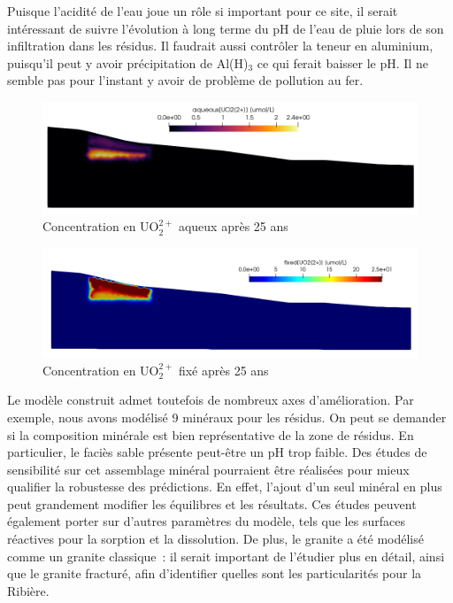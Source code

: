 \documentclass{article}
\newcommand{\blue}[1]{\textcolor{blue}{#1}} %
\begin{document}

Puisque l’acidité de l’eau joue un rôle si important pour ce site, il serait intéressant de suivre l'évolution à long terme du pH de l'eau de pluie lors de son infiltration dans les résidus. Il faudrait aussi contrôler la teneur en aluminium, puisqu’il peut y avoir précipitation de Al(H)$_3$ ce qui ferait baisser le pH. Il ne semble pas pour l’instant y avoir de problème de pollution au fer. 

\begin{figure}[H]
    \centering
    \includegraphics[width=\linewidth]{LJ-UO22P-final.PNG}
    \caption{Concentration en UO$_2^{2+}$ aqueux après 25 ans}
    \label{fig:uo2P-aqueux-final}
\end{figure}

\begin{figure}[H]
    \centering
    \includegraphics[width=\linewidth]{III_B_4_2.png}
    \caption{Concentration en UO$_2^{2+}$ fixé après 25 ans}
    \label{fig:uo2P-fixe-final}
\end{figure}

Le modèle construit admet toutefois de nombreux axes d'amélioration. Par exemple, nous avons modélisé 9 minéraux pour les résidus.
On peut se demander si la composition minérale est bien représentative de la zone de résidus. En particulier, le faciès sable présente peut-être un pH trop faible. Des études de sensibilité sur cet assemblage minéral pourraient être réalisées pour mieux qualifier la robustesse des prédictions.
En effet, l’ajout d’un seul minéral en plus peut grandement modifier les équilibres et les résultats. 
Ces études peuvent également porter sur d’autres paramètres du modèle, tels que les surfaces réactives pour la sorption et la dissolution.
De plus, le granite a été modélisé comme un granite \og classique\fg~: il serait important de l'étudier plus en détail, ainsi que le granite fracturé, afin d'identifier quelles sont les particularités pour la Ribière. 
\end{document}
